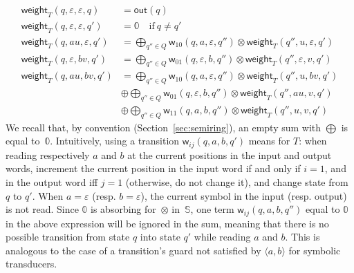 \documentclass[runningheads]{llncs}
\def\<#1>{\langle #1 \rangle}
\newcommand{\Semiring}{\mathbb{S}}
\newcommand{\zero}{\mathbb{0}}
\def\weight{\mathsf{weight}}
\def\wei{\mathsf{w}}
\def\final{\mathsf{out}}
\begin{document}
\begin{align}
\weight_T(q, \varepsilon, \varepsilon, q)  & = \final(q)\\
\weight_T(q, \varepsilon, \varepsilon, q') & = \zero \quad \mathrm{if~} q \neq q'\nonumber\\
\weight_T(q, au, \varepsilon, q') & = \displaystyle\bigoplus_{q'' \in Q} 
    \wei_{10}(q, a, \varepsilon, q'') \otimes \weight_T(q'', u, \varepsilon, q')\nonumber\\
\weight_T(q, \varepsilon, bv, q') & = \displaystyle\bigoplus_{q'' \in Q} 
    \wei_{01}(q, \varepsilon, b, q'') \otimes \weight_T(q'', \varepsilon, v, q')\nonumber\\
\weight_T(q, au, bv, q') & = \displaystyle\bigoplus_{q'' \in Q} 
    \wei_{10}(q, a, \varepsilon, q'') \otimes \weight_T(q'', u, bv, q')\nonumber\\
                    & \oplus \displaystyle\bigoplus_{q'' \in Q} 
    \wei_{01}(q, \varepsilon, b, q'') \otimes \weight_T(q'', au, v, q')\nonumber\\
                    & \oplus \displaystyle\bigoplus_{q'' \in Q} 
    \wei_{11}(q, a, b, q'') \otimes \weight_T(q'', u, v, q')\nonumber
\label{eq:SWT-weight}
\end{align}
%
We recall that, by convention (Section~\ref{sec:semiring}), 
an empty sum with $\bigoplus$ is equal to~$\zero$. 
%
Intuitively, using a transition $\wei_{ij}(q, a, b, q')$ means for $T$:
when reading respectively $a$ and $b$ at the current positions in the input and output words, 
increment the current position in the input word if and only if $i = 1$, 
and in the output word iff $j = 1$ (otherwise, do not change it),
and change state from $q$ to $q'$.
When $a = \varepsilon$ (resp. $b = \varepsilon$), the current symbol 
in the input (resp. output) is not read.
%
%
Since $\zero$ is absorbing for~$\otimes$ in~$\Semiring$,
one term $\wei_{ij}(q, a, b, q'')$ equal to $\zero$ in the above expression 
will be ignored in the sum, meaning that there is no possible transition
from state $q$ into state $q'$ while reading $a$ and $b$.
This is analogous to the case of a transition's guard not satisfied by $\<a, b>$ for 
symbolic transducers.
\end{document}

